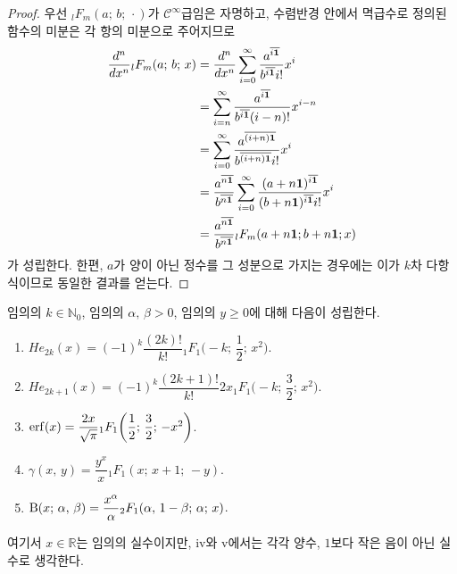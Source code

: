 \begin{proof}
    우선 $_lF_m(a;\,b;\,\cdot)$가 $\mathcal{C}^\infty$급임은 자명하고, 수렴반경 안에서 멱급수로 정의된 함수의 미분은 각 항의 미분으로 주어지므로
    \begin{align*}
        \frac{d^n}{dx^n}{}_lF_m(a;\,b;\,x)&=\frac{d^n}{dx^n}\sum_{i=0}^\infty\frac{a^{\overline{i\mathbf{1}}}}{b^{\overline{i\mathbf{1}}}i!}x^i\\
        &=\sum_{i=n}^\infty\frac{a^{\overline{i\mathbf{1}}}}{b^{\overline{i\mathbf{1}}}(i-n)!}x^{i-n}\\
        &=\sum_{i=0}^\infty\frac{a^{\overline{(i+n)\mathbf{1}}}}{b^{\overline{(i+n)\mathbf{1}}}i!}x^i\\
        &=\frac{a^{\overline{n\mathbf{1}}}}{b^{\overline{n\mathbf{1}}}}\sum_{i=0}^\infty\frac{(a+n\mathbf{1})^{\overline{i\mathbf{1}}}}{(b+n\mathbf{1})^{\overline{i\mathbf{1}}}i!}x^i\\
        &=\frac{a^{\overline{n\mathbf{1}}}}{b^{\overline{n\mathbf{1}}}}{}_lF_m(a+n\mathbf{1};b+n\mathbf{1};x)
    \end{align*}
    가 성립한다. 한편, $a$가 양이 아닌 정수를 그 성분으로 가지는 경우에는 이가 $k$차 다항식이므로 동일한 결과를 얻는다.
\end{proof}

\begin{theorem}
    임의의 $k\in\mathbb{N}_0$, 임의의 $\alpha,\,\beta>0$, 임의의 $y\geq0$에 대해 다음이 성립한다.
    \begin{enumerate}
        \item $He_{2k}(x)=(-1)^k\dfrac{(2k)!}{k!}{}_1F_1\bigg(-k;\,\dfrac{1}{2};\,x^2\bigg)$.
        \item $He_{2k+1}(x)=(-1)^k\dfrac{(2k+1)!}{k!}2x_1F_1\bigg(-k;\,\dfrac{3}{2};\,x^2\bigg)$.
        \item $\mathrm{erf}(x)=\dfrac{2x}{\sqrt{\pi}}{}_1F_1\bigg(\dfrac{1}{2};\,\dfrac{3}{2};\,-x^2\bigg)$.
        \item $\gamma(x,\,y)=\dfrac{y^x}{x}{}_1F_1(x;\,x+1;\,-y)$.
        \item $\mathrm{B}(x;\,\alpha,\,\beta)=\dfrac{x^\alpha}{\alpha}{}_2F_1(\alpha,\,1-\beta;\,\alpha;\,x)$.
    \end{enumerate}
    여기서 $x\in\mathbb{R}$는 임의의 실수이지만, iv와 v에서는 각각 양수, $1$보다 작은 음이 아닌 실수로 생각한다.
\end{theorem}

